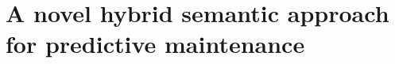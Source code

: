 
\chapter{A novel hybrid semantic approach for predictive maintenance}
\normalsize
\label{ch7}
	\minitoc
\clearpage